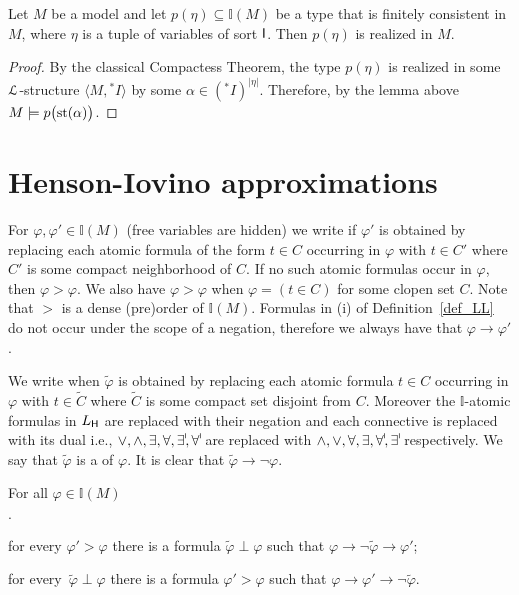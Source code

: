 \documentclass[10pt,oneside]{amsproc}
\newcommand{\mylabel}[1]{{#1}\hfill}
\renewenvironment{itemize}
  {\begin{list}{$\cdot$}{%
  \setlength{\parskip}{0mm}
  \setlength{\topsep}{.4\baselineskip}
  \setlength{\rightmargin}{0mm}
  \setlength{\listparindent}{0mm}
  \setlength{\itemindent}{0mm}
  \setlength{\labelwidth}{3ex}
  \setlength{\itemsep}{.2\baselineskip}
  \setlength{\parsep}{.2\baselineskip}
  \setlength{\partopsep}{0mm}
  \setlength{\labelsep}{1ex}
  \setlength{\leftmargin}{\labelwidth+\labelsep}
  \let\makelabel\mylabel}}{%
\end{list}}
\renewcommand*{\emph}[1]{%
   \smash{\tikz[baseline]\node[rectangle, fill=teal!25, rounded corners, inner xsep=0.5ex, inner ysep=0.2ex, anchor=base, minimum height = 2.7ex]{#1};}}
\begin{document}
\begin{corollary}\label{corol_Isaturation}
  Let $M$ be a model and let $p(\eta)\subseteq\mathds{I}(M)$ be a type that is finitely consistent in $M$, where $\eta$ is a tuple of variables of sort ${\sf I}$.
  Then $p(\eta)$ is realized in $M$.
\end{corollary}

\begin{proof}
  By the classical Compactess Theorem, the type $p(\eta)$ is realized in some ${\EuScript L}$-structure $\langle M,{}^*\!I\rangle$ by
  some $\alpha\in ({}^*\!I)^{|\eta|}$.
  Therefore, by the lemma above $M\models p\big({\rm st}(\alpha)\big)$.
\end{proof}


\section{Henson-Iovino approximations}\label{ultrapws}


For $\varphi,\varphi'\in\mathds{I}(M)$ (free variables are hidden) we write \emph{$\varphi'>\varphi$\/} if $\varphi'$ is obtained by replacing each atomic formula of the form $t\in C$ occurring in $\varphi$ with $t\in C'$ where $C'$ is some compact neighborhood of $C$.
If no such atomic formulas occur in $\varphi$, then $\varphi>\varphi$.
We also have $\varphi>\varphi$ when $\varphi=(t\in C)$ for some clopen set $C$.
Note that $>$ is a dense (pre)order of $\mathds{I}(M)$.
Formulas in (i) of Definition~\ref{def_LL} do not occur under the scope of a negation, therefore we always have that $\varphi\to\varphi'$.

We write \emph{$\tilde{\varphi}\perp\varphi$\/} when $\tilde{\varphi}$ is obtained by replacing each atomic formula $t\in C$ occurring in $\varphi$ with $t\in\tilde{C}$ where $\tilde{C}$ is some compact set disjoint from $C$.
Moreover the $\mathds{I}$-atomic formulas in $L_{\sf H}$ are replaced with their negation and each connective is replaced with its dual i.e., $\vee, \wedge, \exists, \forall, \existsI , \forallI $ are replaced with $\wedge,\vee,\forall,\exists,\forallI ,\existsI $ respectively.
We say that  $\tilde{\varphi}$ is a \emph{strong negation} of $\varphi$.
It is clear that $\tilde{\varphi}\rightarrow\neg\varphi$.

\begin{lemma}\label{lem_interpolation}
  For all  $\varphi\in\mathds{I}(M)$
  \begin{itemize}
    \item[1.]for every $\varphi'>\varphi$ there is a formula $\tilde{\varphi}\perp\varphi$ such that $\varphi\rightarrow\neg \tilde{\varphi}\rightarrow\varphi'$;
    \item[2.] for every\, $\tilde{\varphi}\perp\varphi$ there is a formula $\varphi'>\varphi$ such that  $\varphi\rightarrow\varphi'\rightarrow\neg \tilde{\varphi}$.
  \end{itemize}
\end{lemma}
\end{document}
